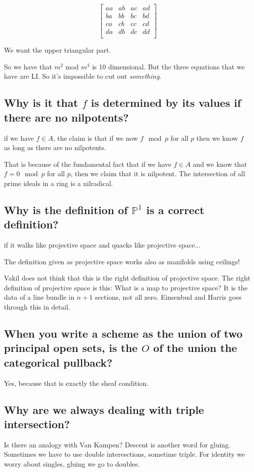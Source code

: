 \documentclass{book}
\renewcommand{\P}{\ensuremath{\mathbb{P}}}
\theoremstyle{definition}
\begin{document}
$$
\begin{bmatrix}
aa & ab & ac & ad \\
ba & bb & bc & bd \\
ca & cb & cc & cd \\
da & db & dc & dd \\
\end{bmatrix}
$$

We want the upper triangular part.

So we have that $m^2$ mod $m^3$ is 10 dimensional. But the three equations
that we have are LI. So it's impossible to cut out \emph{something}.

\subsection{Why is it that $f$ is determined by its values if there are no nilpotents?}
if we have $f \in A$, the claim is that if we now $f \mod p$ for all $p$ then
we know $f$ as long as there are no nilpotents.

That is because of the fundamental fact that if we have $f \in A$ and we 
know that $f = 0 \mod p$ for all $p$, then we claim that it is nilpotent.
The intersection of all prime ideals in a ring is a nilradical.

\subsection{Why is the definition of $\P^1$ is a correct definition?}
if it walks like projective space and quacks like projective space...

The definition given as projective space works also as manifolds using
ceilings! 

Vakil does not think that this is the right definition of projective space.
The right definition of projective space is this: What is a map to
projective space?  It is the data of a line bundle in $n+1$ sections,
not all zero. Einsenbud and Harris goes through this in detail.

\subsection{When you write a scheme as the union of two principal open sets, is the $O$ of the union the categorical pullback?}
Yes, because that is exactly the sheaf condition.

\subsection{Why are we always dealing with triple intersection?}
Is there an analogy with Van Kampen? Descent is another word for gluing.
Sometimes we have to use double interesctions, sometime triple. For identity
we worry about singles, gluing we go to doubles.
\end{document}
